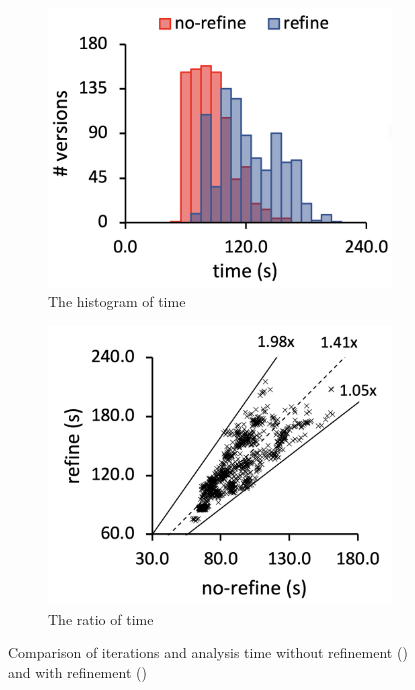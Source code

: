 \begin{figure}
\begin{subfigure}[b]{0.24\textwidth}
    \includegraphics[width=\textwidth]{img/compare-time}
    \caption{The histogram of time}
  \end{subfigure}
  \begin{subfigure}[b]{0.24\textwidth}
    \includegraphics[width=\textwidth]{img/ratio-time}
    \caption{The ratio of time}
  \end{subfigure}
  \caption{Comparison of iterations and analysis time without refinement
  () and with refinement ()}
  \label{fig:performance-compare}
  \vspace*{-1.5em}
\end{figure}

